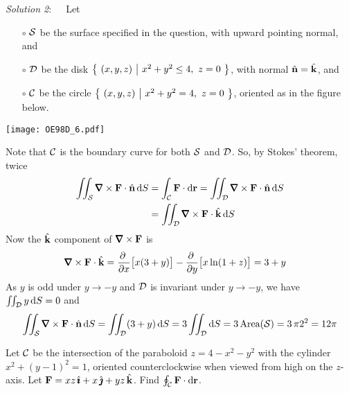 \begin{solution}
\emph{Solution 2}:\ \ \ Let
\begin{itemize}\itemsep1pt \parskip0pt  %
\item[$\circ$]
$\mathcal{S}$ be the surface specified in the question, with upward pointing normal, and
\item[$\circ$]
$\mathcal{D}$ be the disk $\big\{ \ (x,y,z)\ \big|\ x^2+y^2\le 4,\ z=0\ \big\}$, with normal $\hat{\mathbf{n}}=\hat{\mathbf{k}}$, and
\item[$\circ$]
$\mathcal{C}$ be the circle $\big\{ \ (x,y,z)\ \big|\ x^2+y^2=4,\ z=0\ \big\}$, oriented as in the figure below.
\end{itemize}
\begin{center}
     \texttt{[image: OE98D\_6.pdf]}
\end{center}
Note that $\mathcal{C}$ is the boundary curve for both $\mathcal{S}$ and $\mathcal{D}$. So, by
Stokes' theorem, twice 
\begin{align*}
\dblInt_{\cS}\vnabla\times\vF\cdot\hn\,\dee{S}
&=\int_{\cC}\vF\cdot \dee{\vr}
=\dblInt_{\cD}\vnabla\times\vF\cdot\hn\,\dee{S} \\
&=\dblInt_{\cD}\vnabla\times\vF\cdot\hk\,\dee{S}
\end{align*}
Now the $\hat{\mathbf{k}}$ component of $\vnabla\times\vF$ is
\begin{align*}
\vnabla\times\vF\cdot\hk
&=\pdiff{}{x}\big[x(3+y)\big]
 - \pdiff{}{y}\big[x\ln(1+z)\big]
=3+y
\end{align*}
As $y$ is odd under $y\rightarrow-y$ and $\mathcal{D}$ is invariant under $y\rightarrow-y$, we have $\iint_{\mathcal{D}}y\,\mathrm{d}S=0$
and
\begin{align*}
\dblInt_{\cS}\vnabla\times\vF\cdot\hn\,\dee{S}
= \dblInt_{\cD}(3+y)\,\dee{S}
=3\dblInt_{\cD}\dee{S}
=3\,\text{Area}(\cS) =3\,\pi 2^2=12\pi
\end{align*}


\end{solution}


\begin{question}[M317 2001A] %
Let $\mathcal{C}$ be the intersection of the paraboloid $z=4-x^2-y^2$
with the cylinder $x^2+(y-1)^2=1$, oriented counterclockwise when viewed
from high on the $z$-axis. Let $\mathbf{F}=xz\,\hat{\pmb{\imath}}+x\,\hat{\pmb{\jmath}}+yz\,\hat{\mathbf{k}}$. Find
$\oint_{\mathcal{C}}\mathbf{F}\cdot \mathrm{d}\mathbf{r}$. 
\end{question}

